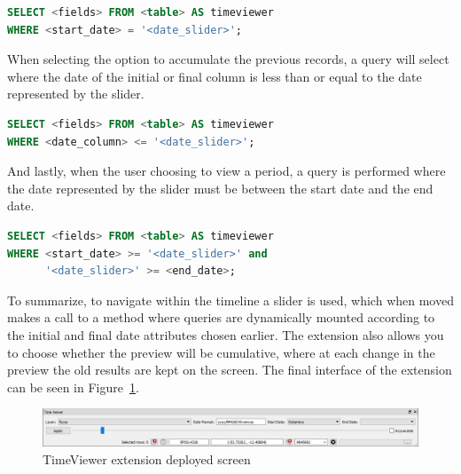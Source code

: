 \documentclass[12pt]{article}
\begin{document}
\begin{lstlisting}[language=SQL, caption=Query for finding records where the initial date matches the slider date, captionpos=b, basicstyle=\footnotesize, frame=tb,
  xleftmargin=.2\textwidth, xrightmargin=.2\textwidth]
SELECT <fields> FROM <table> AS timeviewer
WHERE <start_date> = '<date_slider>';
\end{lstlisting}

When selecting the option to accumulate the previous records, a query will select where the date of the initial or final column is less than or equal to the date represented by the slider.

\begin{lstlisting}[language=SQL, caption=Query for finding records where the initial or final date is less than or equal to the slider date, captionpos=b, basicstyle=\footnotesize, frame=tb,
  xleftmargin=.2\textwidth, xrightmargin=.2\textwidth]
SELECT <fields> FROM <table> AS timeviewer
WHERE <date_column> <= '<date_slider>';
\end{lstlisting}

And lastly, when the user choosing to view a period, a query is performed where the date represented by the slider must be between the start date and the end date.

\begin{lstlisting}[language=SQL, caption=Query for finding records where the slider date is between the initial and final date, captionpos=b, basicstyle=\footnotesize, frame=tb,
  xleftmargin=.2\textwidth, xrightmargin=.2\textwidth]
SELECT <fields> FROM <table> AS timeviewer
WHERE <start_date> >= '<date_slider>' and
      '<date_slider>' >= <end_date>;
\end{lstlisting}

To summarize, to navigate within the timeline a slider is used, which when moved makes a call to a method where queries are dynamically mounted according to the initial and final date attributes chosen earlier. The extension also allows you to choose whether the preview will be cumulative, where at each change in the preview the old results are kept on the screen. The final interface of the extension can be seen in Figure~\ref{fig:timeViewerDock}.

\begin{figure}[ht]
\centering
\includegraphics[width=.9\textwidth]{timeviewer-dock.png}
\caption{TimeViewer extension deployed screen}
\label{fig:timeViewerDock}
\end{figure}
\end{document}
